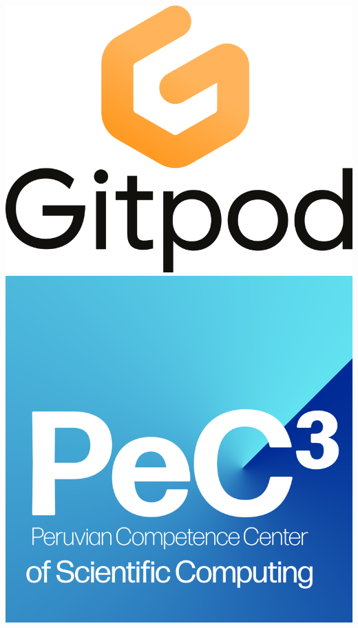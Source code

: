 \documentclass[
	paper=a0,%
	style=ruled, %
	]{bfhsciposter}
\begin{document}
{	\includegraphics[height=\height]{gitpod}\quad
	\includegraphics[height=\height]{pec3logo}\quad
}
\end{document}
